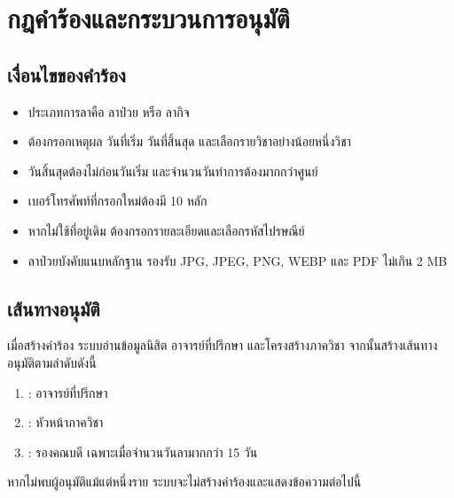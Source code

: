\section{กฎคำร้องและกระบวนการอนุมัติ}
\subsection{เงื่อนไขของคำร้อง}
\begin{itemize}
  \item ประเภทการลาคือ ลาป่วย หรือ ลากิจ
  \item ต้องกรอกเหตุผล วันที่เริ่ม วันที่สิ้นสุด และเลือกรายวิชาอย่างน้อยหนึ่งวิชา
  \item วันสิ้นสุดต้องไม่ก่อนวันเริ่ม และจำนวนวันทำการต้องมากกว่าศูนย์
  \item เบอร์โทรศัพท์ที่กรอกใหม่ต้องมี 10 หลัก
  \item หากไม่ใช้ที่อยู่เดิม ต้องกรอกรายละเอียดและเลือกรหัสไปรษณีย์
  \item ลาป่วยบังคับแนบหลักฐาน รองรับ JPG, JPEG, PNG, WEBP และ PDF ไม่เกิน 2 MB
\end{itemize}

\subsection{เส้นทางอนุมัติ}
เมื่อสร้างคำร้อง ระบบอ่านข้อมูลนิสิต อาจารย์ที่ปรึกษา และโครงสร้างภาควิชา จากนั้นสร้างเส้นทางอนุมัติตามลำดับดังนี้
\begin{enumerate}
  \item {}: อาจารย์ที่ปรึกษา
  \item {}: หัวหน้าภาควิชา
  \item {}: รองคณบดี เฉพาะเมื่อจำนวนวันลามากกว่า 15 วัน
\end{enumerate}

หากไม่พบผู้อนุมัติแม้แต่หนึ่งราย ระบบจะไม่สร้างคำร้องและแสดงข้อความต่อไปนี้
\begin{center}
\end{center}

